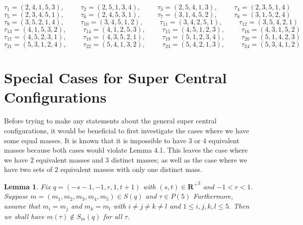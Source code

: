 \documentclass[11pt,leqno]{article}
\newtheorem{lemma}[theorem]{Lemma}
\theoremstyle{definition}
\theoremstyle{remark}
\numberwithin{equation}{section}
\begin{document}
$$ \tau_1=(2,4,1,5,3),\hspace{1cm} \tau_2=(2,5,1,3,4),\hspace{1cm} \tau_3=(2,5,4,1,3),\hspace{1cm} \tau_4=(2,3,5,1,4)$$
$$ \tau_5=(2,3,4,5,1),\hspace{1cm} \tau_6=(2,4,5,3,1),\hspace{1cm} \tau_7=(3,1,4,5,2),\hspace{1cm} \tau_8=(3,1,5,2,4)$$
$$ \tau_9=(3,5,2,1,4),\hspace{1cm} \tau_{10}=(3,4,5,1,2),\hspace{1cm} \tau_{11}=(3,4,2,5,1),\hspace{1cm} \tau_{12}=(3,5,4,2,1)$$
$$ \tau_{13}=(4,1,5,3,2),\hspace{1cm} \tau_{14}=(4,1,2,5,3),\hspace{1cm} \tau_{15}=(4,5,1,2,3),\hspace{1cm} \tau_{16}=(4,3,1,5,2)$$
$$ \tau_{17}=(4,5,2,3,1),\hspace{1cm} \tau_{18}=(4,3,5,2,1),\hspace{1cm} \tau_{19}=(5,1,2,3,4),\hspace{1cm} \tau_{20}=(5,1,4,2,3)$$
$$ \tau_{21}=(5,3,1,2,4),\hspace{1cm} \tau_{22}=(5,4,1,3,2),\hspace{1cm} \tau_{23}=(5,4,2,1,3),\hspace{1cm} \tau_{24}=(5,3,4,1,2)$$

\section{Special Cases for Super Central Configurations}

Before trying to make any statements about the general super central configurations, it would be beneficial to first investigate the cases where we have some equal masses. 
It is known that it is impossible to have $3$ or $4$ equivalent masses because both cases would violate Lemma 4.1. This leaves the case where we have $2$ equivalent masses and $3$ distinct masses; as well as the case where we have two sets of $2$ equivalent masses with only one distinct mass. 

\begin{lemma}
Fix $q=(-s-1, -1, r, 1, t+1)$ with $(s,t)\in \mathbf{R^+}^3$ and $-1<r<1$. Suppose $m=(m_1, m_2, m_3, m_4, m_5)\in S(q)$ and $\tau \in P(5)$ Furthermore, assume that $m_i=m_j$ and $m_k=m_l$ with $i\neq j\neq k\neq l$ and $1\leq i,j,k,l \leq 5$. Then we shall have $m(\tau)\notin S_m(q)$ for all $\tau$.
\end{lemma}
\end{document}
